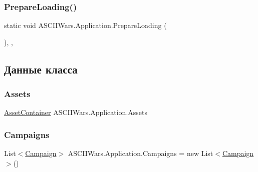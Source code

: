 \hypertarget{class_a_s_c_i_i_wars_1_1_application_a17ad0a44229caa1044d99f975ed97be3}{}\label{class_a_s_c_i_i_wars_1_1_application_a17ad0a44229caa1044d99f975ed97be3} 
\subsubsection{\texorpdfstring{Prepare\+Loading()}{PrepareLoading()}}
{\footnotesize\ttfamily static void A\+S\+C\+I\+I\+Wars.\+Application.\+Prepare\+Loading (\begin{DoxyParamCaption}{ }\end{DoxyParamCaption})\hspace{0.3cm}{\ttfamily [inline]}, {\ttfamily [static]}, {\ttfamily [private]}}



\subsection{Данные класса}
\hypertarget{class_a_s_c_i_i_wars_1_1_application_a85f064f508e8f2448220b04da2ed903c}{}\label{class_a_s_c_i_i_wars_1_1_application_a85f064f508e8f2448220b04da2ed903c} 
\subsubsection{\texorpdfstring{Assets}{Assets}}
{\footnotesize\ttfamily \hyperlink{class_a_s_c_i_i_wars_1_1_game_1_1_asset_container}{Asset\+Container} A\+S\+C\+I\+I\+Wars.\+Application.\+Assets\hspace{0.3cm}{\ttfamily [static]}}

\hypertarget{class_a_s_c_i_i_wars_1_1_application_a42f4ba2e41b2d237ce889719e8f85d0f}{}\label{class_a_s_c_i_i_wars_1_1_application_a42f4ba2e41b2d237ce889719e8f85d0f} 
\subsubsection{\texorpdfstring{Campaigns}{Campaigns}}
{\footnotesize\ttfamily List$<$\hyperlink{class_a_s_c_i_i_wars_1_1_game_1_1_campaign}{Campaign}$>$ A\+S\+C\+I\+I\+Wars.\+Application.\+Campaigns = new List$<$\hyperlink{class_a_s_c_i_i_wars_1_1_game_1_1_campaign}{Campaign}$>$()\hspace{0.3cm}{\ttfamily [static]}}


